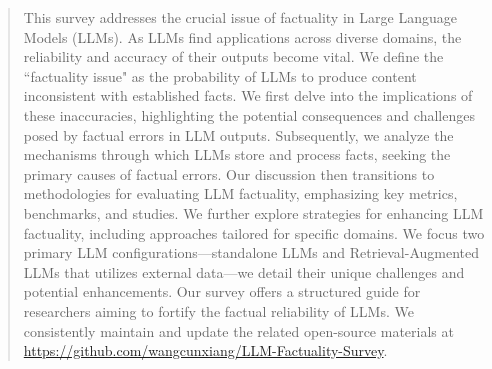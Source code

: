 \documentclass[manuscript,screen,acmsmall]{acmart}
\begin{document}
\author{Jindong Wang}
\author{Xing Xie}


\author{Zheng Zhang}

\author{Yue Zhang}

\renewcommand{\shortauthors}{Wang, et al.}



\begin{abstract}
This survey addresses the crucial issue of factuality in Large Language Models (LLMs). As LLMs find applications across diverse domains, the reliability and accuracy of their outputs become vital. We define the ``factuality issue" as the probability of LLMs to produce content inconsistent with established facts. We first delve into the implications of these inaccuracies, highlighting the potential consequences and challenges posed by factual errors in LLM outputs. Subsequently, we analyze the mechanisms through which LLMs store and process facts, seeking the primary causes of factual errors. Our discussion then transitions to methodologies for evaluating LLM factuality, emphasizing key metrics, benchmarks, and studies. We further explore strategies for enhancing LLM factuality, including approaches tailored for specific domains. We focus two primary LLM configurations—standalone LLMs and Retrieval-Augmented LLMs that utilizes external data—we detail their unique challenges and potential enhancements. Our survey offers a structured guide for researchers aiming to fortify the factual reliability of LLMs. We consistently maintain and update the related open-source materials at \url{https://github.com/wangcunxiang/LLM-Factuality-Survey}. 
\end{abstract}
\end{document}
